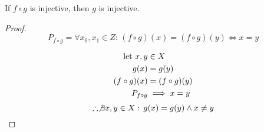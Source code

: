 \begin{question}

	If $f\circ g$ is injective, then $g$ is injective.

	\begin{proof}
		\[ P_{f\circ g} = \forall x_0, x_1  \in Z : \,	(f \circ g)(x) = (f\circ g)(y) \iff x = y \]

		\begin{align*}
			{\text{let } } x, y     & \in X            \\
			g(x)           & = g(y)           \\
			(f \circ g)(x) & = (f \circ g)(y) \\
			P_{f\circ g}   & \implies x = y
		\end{align*}
		$$ \therefore \not\exists x,y\in X : \, g(x) = g(y) \wedge x \neq y $$
	\end{proof}
\end{question}
